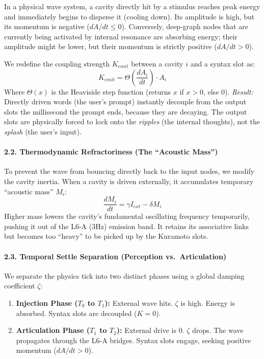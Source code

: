 \documentclass[
  11pt,
  a4paper,
]{article}
\providecommand{\tightlist}{%
  \setlength{\itemsep}{0pt}\setlength{\parskip}{0pt}}
\begin{document}
In a physical wave system, a cavity directly hit by a stimulus reaches
peak energy and immediately begins to disperse it (cooling down). Its
amplitude is high, but its momentum is negative (\(dA/dt \le 0\)).
Conversely, deep-graph nodes that are currently being activated by
internal resonance are absorbing energy; their amplitude might be lower,
but their momentum is strictly positive (\(dA/dt > 0\)).

We redefine the coupling strength \(K_{emit}\) between a cavity \(i\)
and a syntax slot as:
\[ K_{emit} = \Theta\left(\frac{dA_i}{dt}\right) \cdot A_i \] Where
\(\Theta(x)\) is the Heaviside step function (returns \(x\) if \(x>0\),
else \(0\)). \emph{Result:} Directly driven words (the user's prompt)
instantly decouple from the output slots the millisecond the prompt
ends, because they are decaying. The output slots are physically forced
to lock onto the \emph{ripples} (the internal thoughts), not the
\emph{splash} (the user's input).

\paragraph{2.2. Thermodynamic Refractoriness (The ``Acoustic
Mass'')}\label{thermodynamic-refractoriness-the-acoustic-mass}

To prevent the wave from bouncing directly back to the input nodes, we
modify the cavity inertia. When a cavity is driven externally, it
accumulates temporary ``acoustic mass'' \(M_i\):
\[ \frac{dM_i}{dt} = \gamma I_{ext} - \delta M_i \] Higher mass lowers
the cavity's fundamental oscillating frequency temporarily, pushing it
out of the L6-A (3Hz) emission band. It retains its associative links
but becomes too ``heavy'' to be picked up by the Kuramoto slots.

\paragraph{2.3. Temporal Settle Separation (Perception
vs.~Articulation)}\label{temporal-settle-separation-perception-vs.-articulation}

We separate the physics tick into two distinct phases using a global
damping coefficient \(\zeta\):

\begin{enumerate}
\def\labelenumi{\arabic{enumi}.}
\tightlist
\item
  \textbf{Injection Phase (\(T_0\) to \(T_1\)):} External wave hits.
  \(\zeta\) is high. Energy is absorbed. Syntax slots are decoupled
  (\(K=0\)).
\item
  \textbf{Articulation Phase (\(T_1\) to \(T_2\)):} External drive is 0.
  \(\zeta\) drops. The wave propagates through the L6-A bridges. Syntax
  slots engage, seeking positive momentum (\(dA/dt > 0\)).
\end{enumerate}
\end{document}
